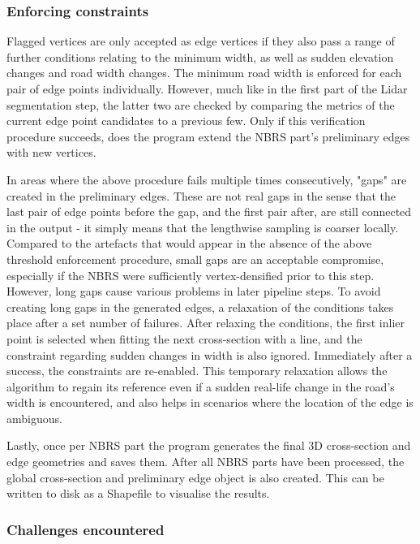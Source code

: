 \subsubsection{Enforcing constraints}

Flagged vertices are only accepted as edge vertices if they also pass a range of further conditions relating to the minimum width, as well as sudden elevation changes and road width changes. The minimum road width is enforced for each pair of edge points individually. However, much like in the first part of the Lidar segmentation step, the latter two are checked by comparing the metrics of the current edge point candidates to a previous few. Only if this verification procedure succeeds, does the program extend the NBRS part's preliminary edges with new vertices.

In areas where the above procedure fails multiple times consecutively, "gaps" are created in the preliminary edges. These are not real gaps in the sense that the last pair of edge points before the gap, and the first pair after, are still connected in the output - it simply means that the lengthwise sampling is coarser locally. Compared to the artefacts that would appear in the absence of the above threshold enforcement procedure, small gaps are an acceptable compromise, especially if the NBRS were sufficiently vertex-densified prior to this step. However, long gaps cause various problems in later pipeline steps. To avoid creating long gaps in the generated edges, a relaxation of the conditions takes place after a set number of failures. After relaxing the conditions, the first inlier point is selected when fitting the next cross-section with a line, and the constraint regarding sudden changes in width is also ignored. Immediately after a success, the constraints are re-enabled. This temporary relaxation allows the algorithm to regain its reference even if a sudden real-life change in the road's width is encountered, and also helps in scenarios where the location of the edge is ambiguous.

Lastly, once per NBRS part the program generates the final 3D cross-section and edge geometries and saves them. After all NBRS parts have been processed, the global cross-section and preliminary edge object is also created. This can be written to disk as a Shapefile to visualise the results.

\subsubsection{Challenges encountered}

